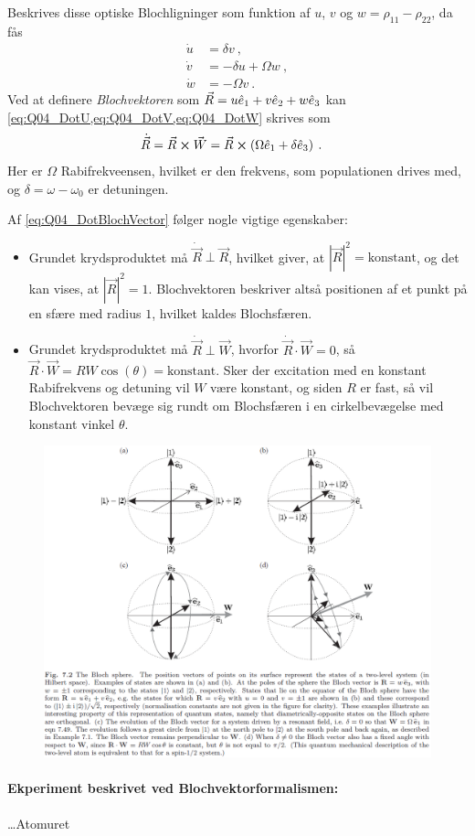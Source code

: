Beskrives disse optiske Blochligninger som funktion af $u$, $v$ og $w = \rho_{11} - \rho_{22}$, da fås
\begin{align}
    \Dot{u} &= \delta v \: , \label{eq:Q04_DotU} \\
    \Dot{v} &= -\delta u + \Omega w \: , \label{eq:Q04_DotV} \\
    \Dot{w} &= -\Omega v \: . \label{eq:Q04_DotW}
\end{align}
Ved at definere \emph{Blochvektoren} som $\Vec{R} = u\Hat{e}_1 + v\Hat{e}_2 + w\Hat{e}_3$ kan \cref{eq:Q04_DotU,eq:Q04_DotV,eq:Q04_DotW} skrives som
\begin{align} \label{eq:Q04_DotBlochVector}
    \Dot{\Vec{R}} &= \Vec{R} \cross \Vec{W} = \Vec{R} \cross \left(\Omega\Hat{e}_1 + \delta\Hat{e}_3\right) \: .
\end{align}
Her er $\Omega$ Rabifrekveensen, hvilket er den frekvens, som populationen drives med, og $\delta = \omega - \omega_0$ er detuningen.

Af \cref{eq:Q04_DotBlochVector} følger nogle vigtige egenskaber:
\begin{itemize}
    \item Grundet krydsproduktet må $\Dot{\Vec{R}} \perp \Vec{R}$, hvilket giver, at $|\Vec{R}|^2 = \text{konstant}$, og det kan vises, at $|\Vec{R}|^2 = 1$. Blochvektoren beskriver altså positionen af et punkt på en sfære med radius $1$, hvilket kaldes Blochsfæren.
    \item Grundet krydsproduktet må $\Dot{\Vec{R}} \perp \Vec{W}$, hvorfor $\Dot{\Vec{R}} \cdot \Vec{W} = 0$, så $\Vec{R} \cdot \Vec{W} = RW\cos(\theta) = \text{konstant}$. Sker der excitation med en konstant Rabifrekvens og detuning vil $W$ være konstant, og siden $R$ er fast, så vil Blochvektoren bevæge sig rundt om Blochsfæren i en cirkelbevægelse med konstant vinkel $\theta$.
\end{itemize}

\begin{figure}[!h]
    \centering
    \includegraphics[width=\textwidth]{Q04/images/BlochSphere.PNG}
    \caption{}
    \label{fig:Q04_BlochSphere}
\end{figure}


\paragraph{Ekperiment beskrivet ved Blochvektorformalismen:} \ldots Atomuret